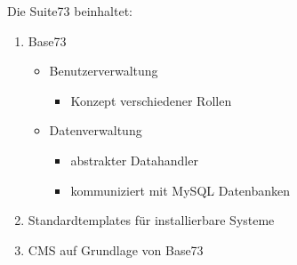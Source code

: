 Die Suite73 beinhaltet:

\begin{enumerate}
	\item Base73 
	\begin{itemize}
		\item Benutzerverwaltung
		\begin{itemize}
			\item Konzept verschiedener Rollen
		\end{itemize}
		\item Datenverwaltung
		\begin{itemize}
			\item abstrakter Datahandler
			\item kommuniziert mit MySQL Datenbanken
		\end{itemize}
	\end{itemize}
	\item Standardtemplates für installierbare Systeme
	\item CMS auf Grundlage von Base73
\end{enumerate} 






